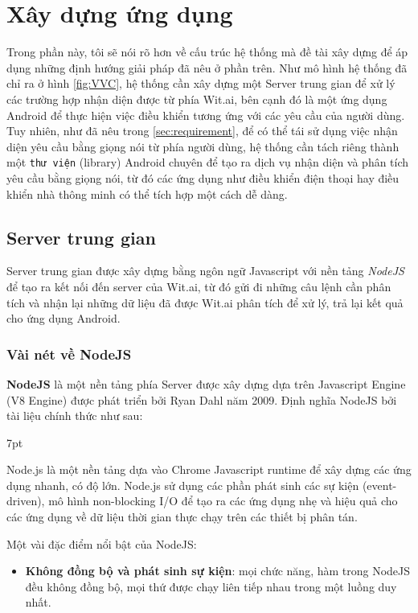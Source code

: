 \documentclass[12pt]{report}
\newenvironment{formal}{%
  \def\FrameCommand{%
    \hspace{1pt}%
    {\color{mygray}\vrule width 6pt}%
    {\color{lightgray}\vrule width 4pt}%
    \colorbox{lightgray}%
  }%
  \MakeFramed{\advance\hsize-\width\FrameRestore}%
  \noindent\hspace{-4.55pt}%
  \begin{adjustwidth}{}{7pt}%
  \vspace{2pt}\vspace{2pt}%
}
{%
  \vspace{2pt}\end{adjustwidth}\endMakeFramed%
}
\begin{document}
\section{Xây dựng ứng dụng}

Trong phần này, tôi sẽ nói rõ hơn về cấu trúc hệ thống mà đề tài xây dựng để áp dụng những định hướng giải pháp đã nêu ở phần trên. Như mô hình hệ thống đã chỉ ra ở hình \ref{fig:VVC}, hệ thống cần xây dựng một Server trung gian để xử lý các trường hợp nhận diện được từ phía Wit.ai, bên cạnh đó là một ứng dụng Android để thực hiện việc điều khiển tương ứng với các yêu cầu của người dùng. Tuy nhiên, như đã nêu trong \ref{sec:requirement}, để có thể tái sử dụng việc nhận diện yêu cầu bằng giọng nói từ phía người dùng, hệ thống cần tách riêng thành một \texttt{thư viện} (library) Android chuyên để tạo ra dịch vụ nhận diện và phân tích yêu cầu bằng giọng nói, từ đó các ứng dụng như điều khiển điện thoại hay điều khiển nhà thông minh có thể tích hợp một cách dễ dàng.

\subsection{Server trung gian}

Server trung gian được xây dựng bằng ngôn ngữ Javascript với nền tảng \textit{NodeJS} để tạo ra kết nối đến server của Wit.ai, từ đó gửi đi những câu lệnh cần phân tích và nhận lại những dữ liệu đã được Wit.ai phân tích để xử lý, trả lại kết quả cho ứng dụng Android.

\subsubsection{Vài nét về NodeJS}

\textbf{NodeJS} là một nền tảng phía Server được xây dựng dựa trên Javascript Engine (V8 Engine) được phát triển bởi Ryan Dahl năm 2009. Định nghĩa NodeJS bởi tài liệu chính thức như sau:

\begin{formal}
Node.js là một nền tảng dựa vào Chrome Javascript runtime để xây dựng các ứng dụng nhanh, có độ lớn. Node.js sử dụng các phần phát sinh các sự kiện (event-driven), mô hình non-blocking I/O để tạo ra các ứng dụng nhẹ và hiệu quả cho các ứng dụng về dữ liệu thời gian thực chạy trên các thiết bị phân tán.
\end{formal}

Một vài đặc điểm nổi bật của NodeJS:

\begin{itemize}
	\item \textbf{Không đồng bộ và phát sinh sự kiện}: mọi chức năng, hàm trong NodeJS đều không đồng bộ, mọi thứ được chạy liên tiếp nhau trong một luồng duy nhất.
\end{itemize}
\end{document}

